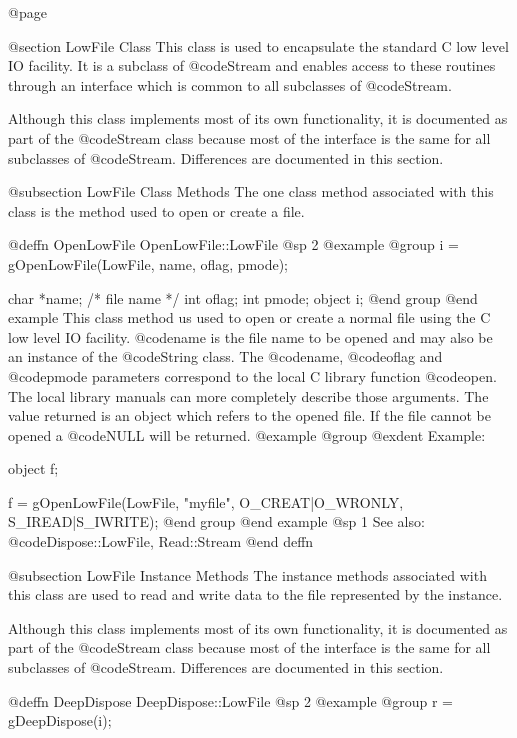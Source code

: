 @page

@section LowFile Class
This class is used to encapsulate the standard C low level IO facility.  It
is a subclass of @code{Stream} and enables access to these routines
through an interface which is common to all subclasses of @code{Stream}.

Although this class implements most of its own functionality, it is
documented as part of the @code{Stream} class because most of the
interface is the same for all subclasses of @code{Stream}.  Differences
are documented in this section.


@subsection LowFile Class Methods
The one class method associated with this class is the method used to
open or create a file.




@deffn {OpenLowFile} OpenLowFile::LowFile
@sp 2
@example
@group
i = gOpenLowFile(LowFile, name, oflag, pmode);

char    *name;  /*  file name  */
int     oflag;
int     pmode;
object  i;
@end group
@end example
This class method us used to open or create a normal file using the C
low level IO facility.  @code{name} is the file name to be opened and
may also be an instance of the @code{String} class.  The @code{name},
@code{oflag} and @code{pmode} parameters correspond to the local C
library function @code{open}.  The local library manuals can more
completely describe those arguments.  The value returned is an object
which refers to the opened file.  If the file cannot be opened a
@code{NULL} will be returned.
@example
@group
@exdent Example:

object  f;

f = gOpenLowFile(LowFile, "myfile", O_CREAT|O_WRONLY,
                 S_IREAD|S_IWRITE);
@end group
@end example
@sp 1
See also:  @code{Dispose::LowFile, Read::Stream}
@end deffn





@subsection LowFile Instance Methods
The instance methods associated with this class are used to read and write
data to the file represented by the instance.

Although this class implements most of its own functionality, it is
documented as part of the @code{Stream} class because most of the
interface is the same for all subclasses of @code{Stream}.  Differences
are documented in this section.





@deffn {DeepDispose} DeepDispose::LowFile
@sp 2
@example
@group
r = gDeepDispose(i);

